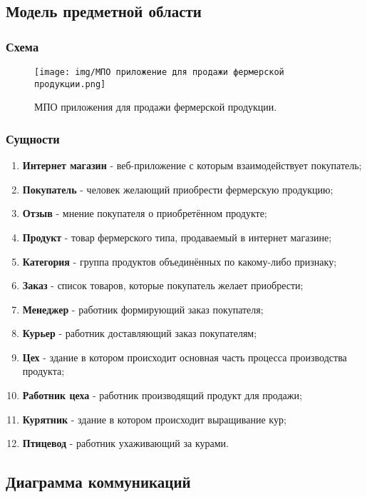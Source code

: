 \documentclass[a4paper]{report}
\begin{document}
\subsection{Модель предметной области}
\subsubsection{Схема}
\begin{figure}[H]
    \centering
    \texttt{[image: img/МПО приложение для продажи фермерской продукции.png]}
    \caption{МПО приложения для продажи фермерской продукции.}
\end{figure}
\subsubsection{Сущности}
\begin{enumerate}
    \item \textbf{Интернет магазин} - веб-приложение с которым взаимодействует покупатель;
    \item \textbf{Покупатель} - человек желающий приобрести фермерскую продукцию;
    \item \textbf{Отзыв} - мнение покупателя о приобретённом продукте;
    \item \textbf{Продукт} - товар фермерского типа, продаваемый в интернет магазине;
    \item \textbf{Категория} - группа продуктов объединённых по какому-либо признаку;
    \item \textbf{Заказ} - список товаров, которые покупатель желает приобрести;
    \item \textbf{Менеджер} - работник формирующий заказ покупателя;
    \item \textbf{Курьер} - работник доставляющий заказ покупателям;
    \item \textbf{Цех} - здание в котором происходит основная часть процесса производства продукта;
    \item \textbf{Работник цеха} - работник производящий продукт для продажи;
    \item \textbf{Курятник} - здание в котором происходит выращивание кур;
    \item \textbf{Птицевод} - работник ухаживающий за курами.
\end{enumerate}

\newpage

\subsection{Диаграмма коммуникаций}
\end{document}
